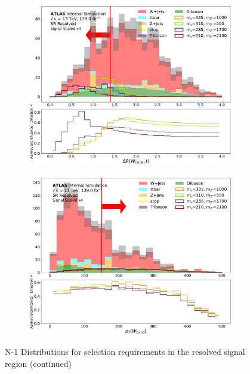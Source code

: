 \begin{figure} \ContinuedFloat
    \begin{subfigure}[t]{0.48\textwidth}
    \centering
     \includegraphics[width = 0.99\textwidth]{Figures/5/SR1L_Resolved/dRWl_N_1.pdf}
    \caption{\drWl}
    \end{subfigure}
    \begin{subfigure}[t]{0.48\textwidth}
    \centering
     \includegraphics[width = 0.99\textwidth]{Figures/5/SR1L_Resolved/WCand_pt_N_1.pdf}
    \caption{\Wcandpt}
    \end{subfigure}
     \caption{N-1 Distributions for selection requirements in the resolved signal region (continued)}
  \end{figure}


